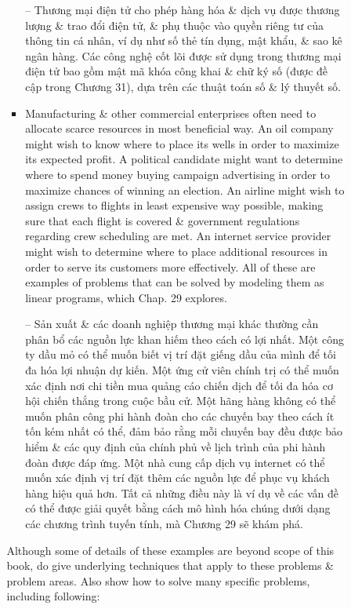 \documentclass{article}
\begin{document}
\begin{itemize}
\begin{itemize}
\begin{itemize}
\begin{itemize}
                -- Thương mại điện tử cho phép hàng hóa \& dịch vụ được thương lượng \& trao đổi điện tử, \& phụ thuộc vào quyền riêng tư của thông tin cá nhân, ví dụ như số thẻ tín dụng, mật khẩu, \& sao kê ngân hàng. Các công nghệ cốt lõi được sử dụng trong thương mại điện tử bao gồm mật mã khóa công khai \& chữ ký số (được đề cập trong Chương 31), dựa trên các thuật toán số \& lý thuyết số.
                \item Manufacturing \& other commercial enterprises often need to allocate scarce resources in most beneficial way. An oil company might wish to know where to place its wells in order to maximize its expected profit. A political candidate might want to determine where to spend money buying campaign advertising in order to maximize chances of winning an election. An airline might wish to assign crews to flights in least expensive way possible, making sure that each flight is covered \& government regulations regarding crew scheduling are met. An internet service provider might wish to determine where to place additional resources in order to serve its customers more effectively. All of these are examples of problems that can be solved by modeling them as linear programs, which Chap. 29 explores.
                
                -- Sản xuất \& các doanh nghiệp thương mại khác thường cần phân bổ các nguồn lực khan hiếm theo cách có lợi nhất. Một công ty dầu mỏ có thể muốn biết vị trí đặt giếng dầu của mình để tối đa hóa lợi nhuận dự kiến. Một ứng cử viên chính trị có thể muốn xác định nơi chi tiền mua quảng cáo chiến dịch để tối đa hóa cơ hội chiến thắng trong cuộc bầu cử. Một hãng hàng không có thể muốn phân công phi hành đoàn cho các chuyến bay theo cách ít tốn kém nhất có thể, đảm bảo rằng mỗi chuyến bay đều được bảo hiểm \& các quy định của chính phủ về lịch trình của phi hành đoàn được đáp ứng. Một nhà cung cấp dịch vụ internet có thể muốn xác định vị trí đặt thêm các nguồn lực để phục vụ khách hàng hiệu quả hơn. Tất cả những điều này là ví dụ về các vấn đề có thể được giải quyết bằng cách mô hình hóa chúng dưới dạng các chương trình tuyến tính, mà Chương 29 sẽ khám phá.
            \end{itemize}
            Although some of details of these examples are beyond scope of this book, do give underlying techniques that apply to these problems \& problem areas. Also show how to solve many specific problems, including following:
            

\end{itemize}
\end{itemize}
\end{itemize}
\end{document}
